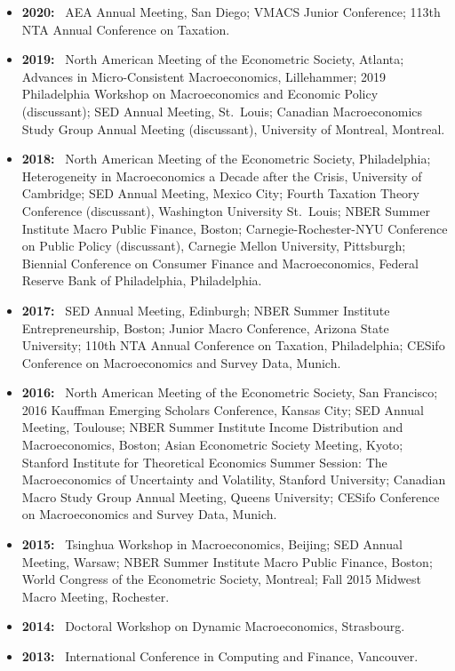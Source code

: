 \documentclass[letterpaper]{article}
\newcommand{\yr}[1]{\textbf{#1:}\ }
\begin{document}
\begin{itemize}
\item \yr{2020} AEA Annual Meeting, San Diego; VMACS Junior Conference; 113th NTA Annual Conference on Taxation.
\item \yr{2019} North American Meeting of the Econometric Society, Atlanta; Advances in Micro-Consistent Macroeconomics, Lillehammer; 2019 Philadelphia Workshop on Macroeconomics and Economic Policy (discussant); SED Annual Meeting, St.\ Louis; Canadian Macroeconomics Study Group Annual Meeting (discussant), University of Montreal, Montreal.
\item \yr{2018} North American Meeting of the Econometric Society, Philadelphia; Heterogeneity in Macroeconomics a Decade after the Crisis, University of Cambridge; SED Annual Meeting, Mexico City; Fourth Taxation Theory Conference (discussant), Washington University St.\ Louis; NBER Summer Institute Macro Public Finance, Boston; Carnegie-Rochester-NYU Conference on Public Policy (discussant), Carnegie Mellon University, Pittsburgh; Biennial Conference on Consumer Finance and Macroeconomics, Federal Reserve Bank of Philadelphia, Philadelphia.
\item \yr{2017} SED Annual Meeting, Edinburgh; NBER Summer Institute Entrepreneurship, Boston; Junior Macro Conference, Arizona State University; 110th NTA Annual Conference on Taxation, Philadelphia; CESifo Conference on Macroeconomics and Survey Data, Munich.
\item \yr{2016} North American Meeting of the Econometric Society, San Francisco; 2016 Kauffman Emerging Scholars Conference, Kansas City; SED Annual Meeting, Toulouse; NBER Summer Institute Income Distribution and Macroeconomics, Boston; Asian Econometric Society Meeting, Kyoto; Stanford Institute for Theoretical Economics Summer Session: The Macroeconomics of Uncertainty and Volatility, Stanford University; Canadian Macro Study Group Annual Meeting, Queens University; CESifo Conference on Macroeconomics and Survey Data, Munich.
\item \yr{2015} Tsinghua Workshop in Macroeconomics, Beijing; SED Annual Meeting, Warsaw; NBER Summer Institute Macro Public Finance, Boston; World Congress of the Econometric Society, Montreal; Fall 2015 Midwest Macro Meeting, Rochester.
\item \yr{2014} Doctoral Workshop on Dynamic Macroeconomics, Strasbourg.
\item \yr{2013} International Conference in Computing and Finance, Vancouver.
\end{itemize}
\end{document}
